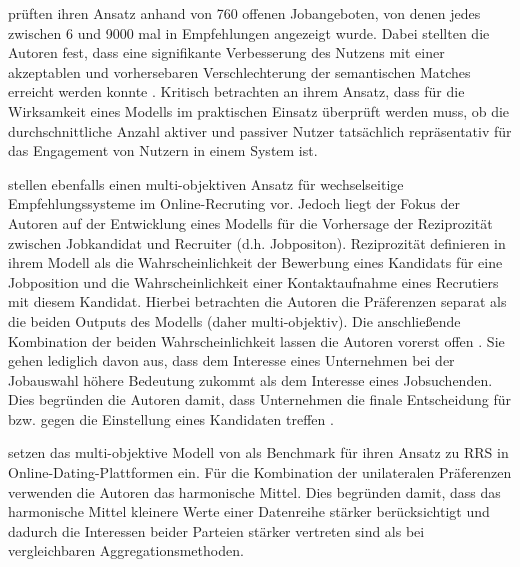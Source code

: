 \textcite[S. 15f.]{rodriguez:inproceedings} prüften ihren Ansatz anhand von 760 offenen Jobangeboten, von denen jedes zwischen 6 und 9000 mal in Empfehlungen angezeigt wurde.
Dabei stellten die Autoren fest, dass eine signifikante Verbesserung des Nutzens mit einer akzeptablen und vorhersebaren Verschlechterung der semantischen Matches erreicht werden konnte \cite[S. 11]{rodriguez:inproceedings}.
Kritisch betrachten \textcite[S. 16]{rodriguez:inproceedings} an ihrem Ansatz, dass für die Wirksamkeit eines Modells im praktischen Einsatz überprüft werden muss, ob die durchschnittliche Anzahl aktiver und passiver Nutzer tatsächlich repräsentativ für das Engagement von Nutzern in einem System ist.

\textcite[S. 1467ff.]{yildirim:article} stellen ebenfalls einen multi-objektiven Ansatz für wechselseitige Empfehlungssysteme im Online-Recruting vor.
Jedoch liegt der Fokus der Autoren auf der Entwicklung eines Modells für die Vorhersage der Reziprozität zwischen Jobkandidat und Recruiter (d.h. Jobpositon).
Reziprozität definieren \textcite[S. 1470]{yildirim:article} in ihrem Modell als die Wahrscheinlichkeit der Bewerbung eines Kandidats für eine Jobposition und die Wahrscheinlichkeit einer Kontaktaufnahme eines Recrutiers mit diesem Kandidat.
Hierbei betrachten die Autoren die Präferenzen separat als die beiden Outputs des Modells (daher multi-objektiv).
Die anschließende Kombination der beiden Wahrscheinlichkeit lassen die Autoren vorerst offen \cite[S. 1474]{yildirim:article}.
Sie gehen lediglich davon aus, dass dem Interesse eines Unternehmen bei der Jobauswahl höhere Bedeutung zukommt als dem Interesse eines Jobsuchenden.
Dies begründen die Autoren damit, dass Unternehmen die finale Entscheidung für bzw. gegen die Einstellung eines Kandidaten treffen \cite[S. 1470]{yildirim:article}.

\textcite[S. 705ff.]{kumari:article} setzen das multi-objektive Modell von \textcite[S. 1467ff.]{yildirim:article} als Benchmark für ihren Ansatz zu \ac{RRS} in Online-Dating-Plattformen ein.
Für die Kombination der unilateralen Präferenzen verwenden die Autoren das harmonische Mittel.
Dies begründen \textcite[S. 724]{kumari:article} damit, dass das harmonische Mittel kleinere Werte einer Datenreihe stärker berücksichtigt und dadurch die Interessen beider Parteien stärker vertreten sind als bei vergleichbaren Aggregationsmethoden.

